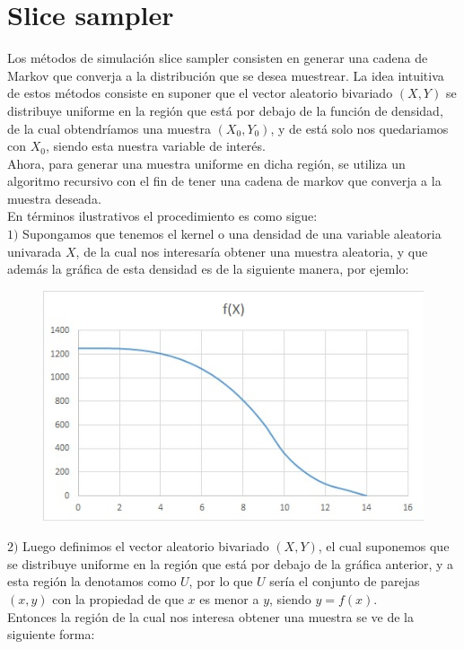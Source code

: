 \chapter{Slice sampler}

Los métodos de simulación slice sampler consisten en generar una cadena de Markov que converja a la distribución que se desea muestrear. La idea intuitiva de estos métodos consiste en suponer que el vector aleatorio bivariado $(X,Y)$ se distribuye uniforme en la región que está por debajo de la función de densidad, de la cual obtendríamos una muestra $(X_{0},Y_{0})$, y de está solo nos quedariamos con $X_{0}$, siendo esta nuestra variable de interés.\\ 

Ahora, para generar una muestra uniforme en dicha región, se utiliza un algoritmo recursivo con el fin de tener una cadena de markov que converja a la muestra deseada.\\

En términos ilustrativos el procedimiento es como sigue:\\

$1)$ Supongamos que tenemos el kernel o una densidad de una variable aleatoria univarada $X$, de la cual nos interesaría obtener una muestra aleatoria, y que además la gráfica de esta densidad es de la siguiente manera, por ejemlo:

\begin{figure}[h]
	\centering
	\includegraphics[width=0.7\linewidth]{Figuras/Slicesampler1}
	\caption{}
	\label{Grafica}
\end{figure}

\bigskip
$2)$ Luego definimos el vector aleatorio bivariado $(X,Y)$, el cual suponemos que se distribuye uniforme en la región que está por debajo de la gráfica anterior, y a esta región la denotamos como $U$, por lo que $U$ sería el conjunto de parejas $(x,y)$ con la propiedad de que $x$ es menor a $y$, siendo $y=f(x)$.\\ Entonces la región de la cual nos interesa obtener una muestra se ve de la siguiente forma:

